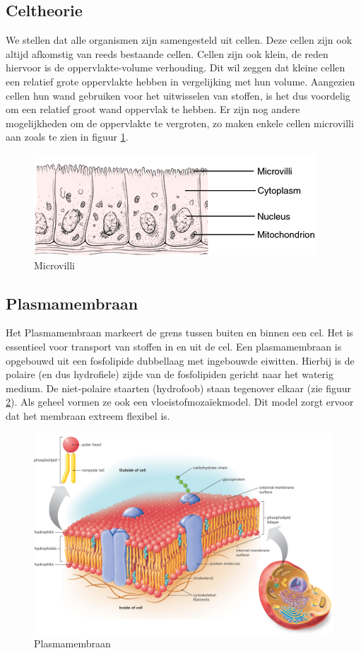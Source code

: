 \documentclass[a4paper,kul]{kulakarticle} %
\begin{document}
\subsection{Celtheorie}
We stellen dat alle organismen zijn samengesteld uit cellen. Deze cellen zijn ook altijd afkomstig van reeds bestaande cellen. Cellen zijn ook klein, de reden hiervoor is de oppervlakte-volume verhouding. Dit wil zeggen dat kleine cellen een relatief grote oppervlakte hebben in vergelijking met hun volume. Aangezien cellen hun wand gebruiken voor het uitwisselen van stoffen, is het dus voordelig om een relatief groot wand oppervlak te hebben. Er zijn nog andere mogelijkheden om de oppervlakte te vergroten, zo maken enkele cellen microvilli aan zoals te zien in figuur \ref{fig:microvilli}.
\begin{figure}[h]
	\centering
	\includegraphics[width=0.7\linewidth]{Microvilli}
	\caption[Microvilli]{Microvilli}
	\label{fig:microvilli}
\end{figure}
\newpage
\subsection{Plasmamembraan}
Het Plasmamembraan markeert de grens tussen buiten en binnen een cel. Het is essentieel voor transport van stoffen in en uit de cel. Een plasmamembraan is opgebouwd uit een fosfolipide dubbellaag met ingebouwde eiwitten. Hierbij is de polaire (en dus hydrofiele) zijde van de fosfolipiden gericht naar het waterig medium. De niet-polaire staarten (hydrofoob) staan tegenover elkaar (zie figuur \ref{fig:plasmamembraan}). Als geheel vormen ze ook een vloeistofmozaïekmodel. Dit model zorgt ervoor dat het membraan extreem flexibel is. 
\begin{figure}[h]
	\centering
	\includegraphics[width=0.8\linewidth]{Plasmamembraan}
	\caption[Plasmamembraan]{Plasmamembraan}
	\label{fig:plasmamembraan}
\end{figure}
\end{document}
